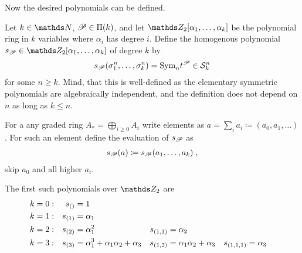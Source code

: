 Now the desired polynomials can be defined.
\begin{Def}
  Let $k\in\Nat$, $\mathscr{P}\in\Pi({k})$, and let
  $\Zmod2[\alpha_1,\dotsc,\alpha_k]$ be the polynomial ring in $k$
  variables where $\alpha_i$ has degree $i$.
  Define the homogenous polynomial
  $\s{\Part}\in\Zmod2[\alpha_1,\dotsc,\alpha_k]$ of degree $k$ by
  \begin{gather*}
    s_{\mathscr{P}}(\sigma_{1}^{n},\dotsc, \sigma_{k}^{n}) = \text{\normalfont Sym}_{n} t^{\mathscr{P}} \in \mathcal{S}^{n}_k
  \end{gather*}
  for some $n\geq k$. Mind, that this is well-defined as the
  elementary symmetric polynomials are algebraically independent, and
  the definition does not depend on $n$ as long as $k\leq n$.
  
  For a any graded ring $A_*=\bigoplus_{i\geq 0} A_i$ write elements as
  $a=\sum_i a_i \coloneqq (a_0,a_1,\dotsc)$.
  For such an element define the evaluation of $s_{\mathscr{P}}$ as
  \begin{gather*}
    s_{\mathscr{P}}(a) \coloneqq s_{\mathscr{P}}(a_1,\dotsc,a_k)
    \;,
  \end{gather*}
  \idest skip $a_0$ and all higher $a_i$.
\end{Def}
\begin{Ex}
  The first such polynomials over $\Zmod2$ are
  \begin{align*}
    k&=0:
    &s_{()} &= 1
    \\ k&=1:
    &s_{(1)} &= \alpha_1
    \\ k&=2:
    &s_{(2)} &= \alpha_1^2
        &s_{(1,1)} &= \alpha_2
    \\ k&=3:
    &s_{(3)} &= \alpha_1^3 + \alpha_1\alpha_2 + \alpha_3
        &s_{(1,2)} &= \alpha_1\alpha_2 + \alpha_3
             &s_{(1,1,1)} &= \alpha_3
  \end{align*}
  \cite[p.~90]{milnorlectures}
\end{Ex}

